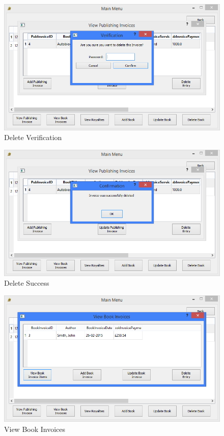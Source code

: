 \begin{figure}[H]
    \caption{Delete Verification} \label{fig:DeletePubInvoice}
    \includegraphics[width=\textwidth]{./Maintenance/UserInterface/DeletePubInvoice.png}
\end{figure}

\begin{figure}[H]
    \caption{Delete Success} \label{fig:DeletePubInvoiceSuccess}
    \includegraphics[width=\textwidth]{./Maintenance/UserInterface/DeletePubInvoiceSuccess.png}
\end{figure}

\begin{figure}[H]
    \caption{View Book Invoices} \label{fig:ViewBookInvoices}
    \includegraphics[width=\textwidth]{./Maintenance/UserInterface/ViewBookInvoices.png}
\end{figure}

